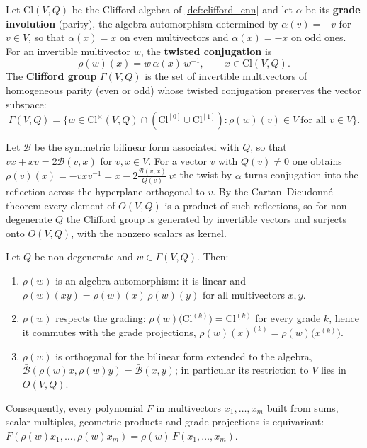 \begin{definition}\label{def:grupo_clifford}
Let $\text{Cl}(V,Q)$ be the Clifford algebra of \autoref{def:clifford_cnn} and let $\alpha$ be its \textbf{grade involution} (parity), the algebra automorphism determined by $\alpha(v) = -v$ for $v \in V$, so that $\alpha(x) = x$ on even multivectors and $\alpha(x) = -x$ on odd ones. For an invertible multivector $w$, the \textbf{twisted conjugation} is
\[\rho(w)(x) = w \, \alpha(x) \, w^{-1}, \qquad x \in \text{Cl}(V,Q).\]
The \textbf{Clifford group} $\Gamma(V,Q)$ is the set of invertible multivectors of homogeneous parity (even or odd) whose twisted conjugation preserves the vector subspace:
\[\Gamma(V,Q) = \big\{ w \in \text{Cl}^\times(V,Q) \cap (\text{Cl}^{[0]} \cup \text{Cl}^{[1]}) : \rho(w)(v) \in V \ \text{for all } v \in V \big\}.\]
\end{definition}

Let $\mathcal{B}$ be the symmetric bilinear form associated with $Q$, so that $vx + xv = 2\mathcal{B}(v,x)$ for $v, x \in V$. For a vector $v$ with $Q(v) \neq 0$ one obtains $\rho(v)(x) = -vxv^{-1} = x - 2\frac{\mathcal{B}(v,x)}{Q(v)}\,v$: the twist by $\alpha$ turns conjugation into the reflection across the hyperplane orthogonal to $v$. By the Cartan--Dieudonn\'e theorem every element of $O(V,Q)$ is a product of such reflections, so for non-degenerate $Q$ the Clifford group is generated by invertible vectors and surjects onto $O(V,Q)$, with the nonzero scalars as kernel.

\begin{proposition}\label{prop:equivarianza_grupo_clifford}
Let $Q$ be non-degenerate and $w \in \Gamma(V,Q)$. Then:
\begin{enumerate}
    \item $\rho(w)$ is an algebra automorphism: it is linear and $\rho(w)(xy) = \rho(w)(x)\,\rho(w)(y)$ for all multivectors $x, y$.
    \item $\rho(w)$ respects the grading: $\rho(w)\big(\text{Cl}^{(k)}\big) = \text{Cl}^{(k)}$ for every grade $k$, hence it commutes with the grade projections, $\rho(w)(x)^{(k)} = \rho(w)\big(x^{(k)}\big)$.
    \item $\rho(w)$ is orthogonal for the bilinear form extended to the algebra, $\bar{\mathcal{B}}(\rho(w)x, \rho(w)y) = \bar{\mathcal{B}}(x,y)$; in particular its restriction to $V$ lies in $O(V,Q)$.
\end{enumerate}
Consequently, every polynomial $F$ in multivectors $x_1, \dots, x_m$ built from sums, scalar multiples, geometric products and grade projections is equivariant: $F(\rho(w)x_1, \dots, \rho(w)x_m) = \rho(w)\,F(x_1,\dots,x_m)$.
\end{proposition}

